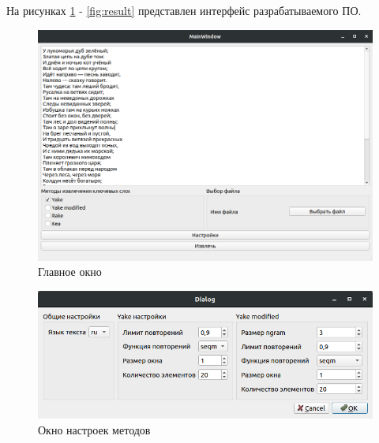 На рисунках \ref{fig:1} - \ref{fig:result} представлен интерфейс разрабатываемого ПО.

\begin{figure}[!h]
	\centering
	\includegraphics[width=1\linewidth]{src/img/programm/1}
	\caption{Главное окно}
	\label{fig:1}
\end{figure}

\begin{figure}[!h]
	\centering
	\includegraphics[width=1\linewidth]{src/img/programm/settings}
	\caption{Окно настроек методов}
	\label{fig:settings}
\end{figure}

